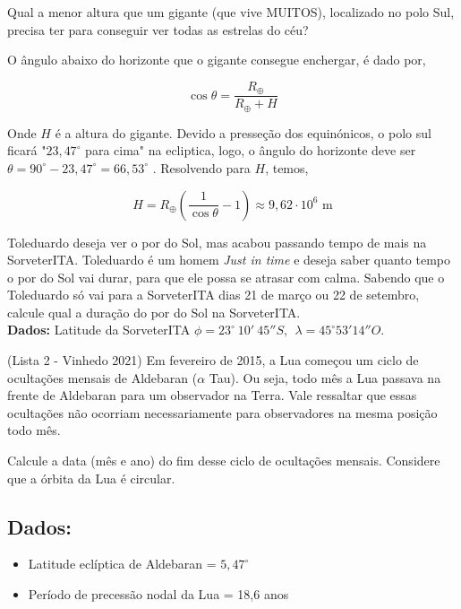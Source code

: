 \documentclass[11pt]{article}
\begin{document}
\begin{pproblem}
    Qual a menor altura que um gigante (que vive MUITOS), localizado no polo Sul, precisa ter para conseguir ver todas as estrelas do céu?

\begin{pssolution*}
    O ângulo abaixo do horizonte que o gigante consegue enchergar, é dado por, 


    \[\cos\theta = \frac{R_\oplus}{R_\oplus + H}\]

    Onde \(H\) é a altura do gigante. Devido a presseção dos equinónicos, o polo sul ficará "\(23,47^\circ\) para cima" na ecliptica, logo, o ângulo do horizonte deve ser \(\theta = 90^\circ -23,47^\circ = 66,53^\circ\) . Resolvendo para \(H\), temos, 

    \[\boxed{H = R_\oplus\left(\frac{1}{\cos\theta}-1\right) \approx 9,62\cdot 10^6\text{ m}}\]
\end{pssolution*}
\end{pproblem}


\begin{pproblem}
    Toleduardo deseja ver o por do Sol, mas acabou passando tempo de mais na SorveterITA. Toleduardo é um homem \textit{Just in time} e deseja saber quanto tempo o por do Sol vai durar, para que ele possa se atrasar com calma. Sabendo que o Toleduardo só vai para a SorveterITA dias 21 de março ou 22 de setembro, calcule qual a duração do por do Sol na SorveterITA.
    \\
    \textbf{Dados: } Latitude da SorveterITA \(\phi = 23^\circ \ 10' \ 45''S, \ \ \lambda = 45^\circ 53' 14''O\).
\end{pproblem}


\begin{pproblem} (Lista 2 - Vinhedo 2021)
    Em fevereiro de 2015, a Lua começou um ciclo de ocultações mensais de Aldebaran ($\alpha$ Tau). Ou seja, todo mês a Lua passava na frente de Aldebaran para um observador na Terra. Vale ressaltar que essas ocultações não ocorriam necessariamente para observadores na mesma posição todo mês. 

    Calcule a data (mês e ano) do fim desse ciclo de ocultações mensais. Considere que a órbita da Lua é circular.

    \subsection*{Dados:}

    \begin{itemize}
        \item Latitude eclíptica de Aldebaran = $5,47^\circ$
        \item Período de precessão nodal da Lua = 18,6 anos
    \end{itemize}

\end{pproblem}
\end{document}
